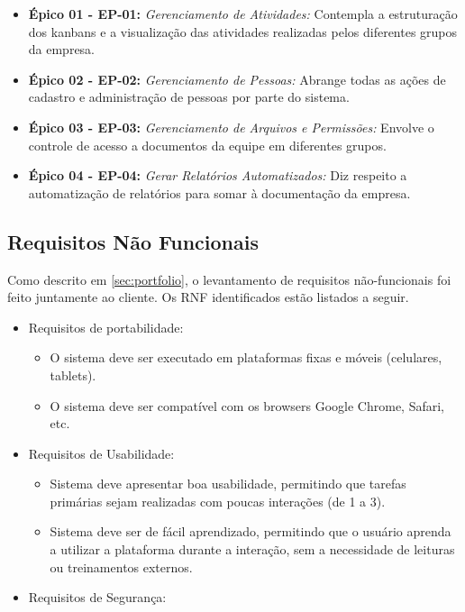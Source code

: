 \begin{itemize}
  \item \textbf{Épico 01 - EP-01:} \textit{Gerenciamento de Atividades:} Contempla a estruturação dos kanbans e a visualização das atividades realizadas pelos diferentes grupos da empresa.
  \item \textbf{Épico 02 - EP-02:} \textit{Gerenciamento de Pessoas:} Abrange todas as ações de cadastro e administração de pessoas por parte do sistema.
  \item \textbf{Épico 03 - EP-03:} \textit{Gerenciamento de Arquivos e Permissões:} Envolve o controle de acesso a documentos da equipe em diferentes grupos.
  \item \textbf{Épico 04 - EP-04:} \textit{Gerar Relatórios Automatizados:} Diz respeito a automatização de relatórios para somar à documentação da empresa.
\end{itemize}

\subsection{Requisitos Não Funcionais}
Como descrito em \ref{sec:portfolio}, o levantamento de requisitos não-funcionais foi feito juntamente ao cliente. Os RNF identificados estão listados a seguir.

\begin{itemize}
  \item Requisitos de portabilidade:
    \begin{itemize}
      \item O sistema deve ser executado em plataformas fixas e móveis (celulares, tablets).
      \item O sistema deve ser compatível com os browsers Google Chrome, Safari, etc.
    \end{itemize}
  \item Requisitos de Usabilidade:
    \begin{itemize}
      \item Sistema deve apresentar boa usabilidade, permitindo que tarefas primárias sejam realizadas com poucas interações (de 1 a 3).
      \item Sistema deve ser de fácil aprendizado, permitindo que o usuário aprenda a utilizar a plataforma durante a interação, sem a necessidade de leituras ou treinamentos externos.
    \end{itemize}
  \item Requisitos de Segurança:
\end{itemize}



